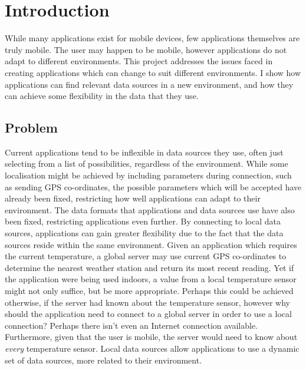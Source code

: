\documentclass[12pt,twoside,notitlepage]{report}
\begin{document}
\bigskip
\bigskip
{}

\cleardoublepage

\tableofcontents

\listoffigures

\newpage


\cleardoublepage        %

\setcounter{page}{1}
\pagestyle{headings}

\chapter{Introduction}

While many applications exist for mobile devices, few applications themselves are truly mobile. 
The user may happen to be mobile, however applications do not adapt to different environments. 
This project addresses the issues faced in creating applications which can change to suit different environments. 
I show how applications can find relevant data sources in a new environment, and how they can achieve some flexibility in the data that they use. 

\section{Problem}

Current applications tend to be inflexible in data sources they use, often just selecting from a list of possibilities, regardless of the environment. 
While some localisation might be achieved by including parameters during connection, such as sending GPS co-ordinates, the possible parameters which will be accepted have already been fixed, restricting how well applications can adapt to their environment. 
The data formats that applications and data sources use have also been fixed, restricting applications even further.
By connecting to local data sources, applications can gain greater flexibility due to the fact that the data sources reside within the same environment.
Given an application which requires the current temperature, a global server may use current GPS co-ordinates to determine the nearest weather station and return its most recent reading. 
Yet if the application were being used indoors, a value from a local temperature sensor might not only suffice, but be more appropriate. 
Perhaps this could be achieved otherwise, if the server had known about the temperature sensor, however why should the application need to connect to a global server in order to use a local connection? Perhaps there isn't even an Internet connection available. 
Furthermore, given that the user is mobile, the server would need to know about {\sl every} temperature sensor. 
Local data sources allow applications to use a dynamic set of data sources, more related to their environment. 
\end{document}
